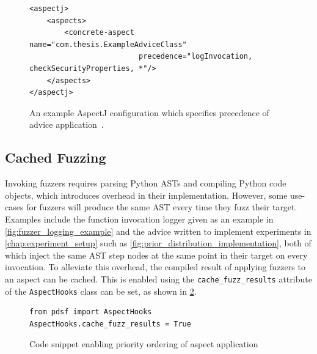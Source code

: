 \begin{figure}
\centering
\begin{lstlisting}[style=footnotesize_xml]
<aspectj>
    <aspects>
        <concrete-aspect name="com.thesis.ExampleAdviceClass"
                         precedence="logInvocation, checkSecurityProperties, *"/>
    </aspects>
</aspectj>
\end{lstlisting}
\caption{An example AspectJ configuration which specifies precedence of advice
application~\cite{aspectj-advice-precedence-documentation}.}
\label{fig:aspectj-advice-precedence-config-example}
\end{figure}


\subsection{Cached Fuzzing}
\label{subsec:cached_fuzzing}

Invoking fuzzers requires parsing Python ASTs and compiling Python code objects,
which introduces overhead in their implementation. However, some use-cases for
fuzzers will produce the same AST every time they fuzz their target. Examples
include the function invocation logger given as an example in
\cref{fig:fuzzer_logging_example} and the advice written to implement
experiments in \cref{chap:experiment_setup} such as
\cref{fig:prior_distribution_implementation}, both of which inject the same AST
step nodes at the same point in their target on every invocation. To alleviate
this overhead, the compiled result of applying fuzzers to an aspect can be
cached. This is enabled using the \lstinline{cache_fuzz_results} attribute of
the \lstinline{AspectHooks} class can be set, as shown in
\cref{fig:enabling_fuzzer_caching}.

\begin{figure}[h]
    \begin{lstlisting}[style=footnotesize_python]
from pdsf import AspectHooks
AspectHooks.cache_fuzz_results = True
    \end{lstlisting}
    \caption{Code snippet enabling priority ordering of aspect application}
    \label{fig:enabling_fuzzer_caching}
\end{figure}


